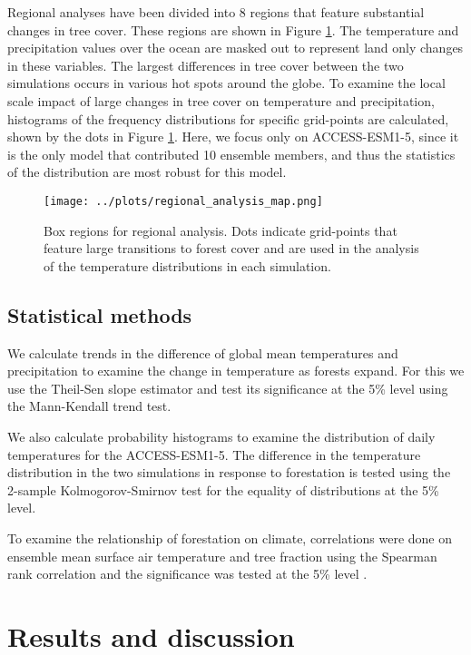 \documentclass[]{article}
\begin{document}
Regional analyses have been divided into 8 regions that feature substantial changes in tree cover.
These regions are shown in Figure \ref{fig:box_regions}.
The temperature and precipitation values over the ocean are masked out to represent land only changes in these variables.
The largest differences in tree cover between the two simulations occurs in various hot spots around the globe.
To examine the local scale impact of large changes in tree cover on temperature and precipitation, histograms of the frequency distributions for specific grid-points are calculated, shown by the dots in Figure \ref{fig:box_regions}.
Here, we focus only on ACCESS-ESM1-5, since it is the only model that contributed 10 ensemble members, and thus the statistics of the distribution are most robust for this model.

\begin{figure}[H]
    \centering
    \texttt{[image: ../plots/regional\_analysis\_map.png]}
    \caption{Box regions for regional analysis. Dots indicate grid-points that feature large transitions to forest cover and are used in the analysis of the temperature distributions in each simulation.}
    \label{fig:box_regions}
\end{figure}

\subsection{Statistical methods}

We calculate trends in the difference of global mean temperatures and precipitation to examine the change in temperature as forests expand.
For this we use the Theil-Sen slope estimator and test its significance at the 5\% level using the Mann-Kendall trend test.

We also calculate probability histograms to examine the distribution of daily temperatures for the ACCESS-ESM1-5.
The difference in the temperature distribution in the two simulations in response to forestation is tested using the 2-sample Kolmogorov-Smirnov test for the equality of distributions at the 5\% level.

To examine the relationship of forestation on climate, correlations were done on ensemble mean surface air temperature and tree fraction using the Spearman rank correlation and the significance was tested at the 5\% level \parencite{kokoska2000crc}.

\section{Results and discussion}
\end{document}
